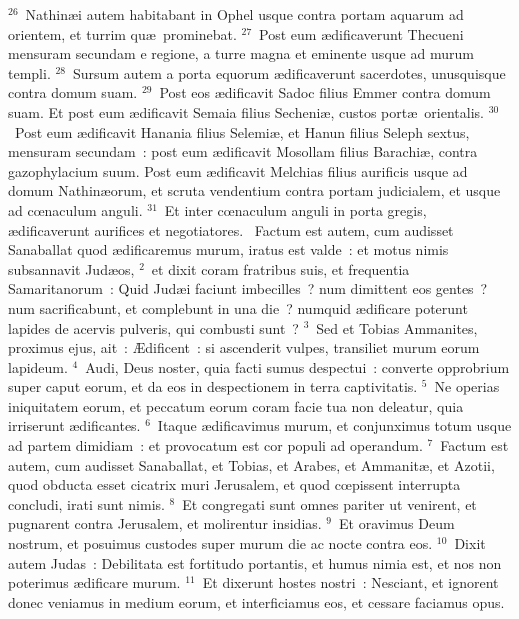 ${}^{26}$~Nathin\ae i autem habitabant in Ophel usque contra portam aquarum ad orientem, et turrim qu\ae\ prominebat.
${}^{27}$~Post eum \ae dificaverunt Thecueni mensuram secundam e regione, a turre magna et eminente usque ad murum templi.
${}^{28}$~Sursum autem a porta equorum \ae dificaverunt sacerdotes, unusquisque contra domum suam.
${}^{29}$~Post eos \ae dificavit Sadoc filius Emmer contra domum suam. Et post eum \ae dificavit Semaia filius Secheni\ae , custos port\ae\ orientalis.
${}^{30}$~Post eum \ae dificavit Hanania filius Selemi\ae , et Hanun filius Seleph sextus, mensuram secundam~: post eum \ae dificavit Mosollam filius Barachi\ae , contra gazophylacium suum. Post eum \ae dificavit Melchias filius aurificis usque ad domum Nathin\ae orum, et scruta vendentium contra portam judicialem, et usque ad cœnaculum anguli.
${}^{31}$~Et inter cœnaculum anguli in porta gregis, \ae dificaverunt aurifices et negotiatores.
~\lettrine[lines=10,image=true,loversize=0.05,lraise=-0.03]{F}{}actum est autem, cum audisset Sanaballat quod \ae dificaremus murum, iratus est valde~: et motus nimis subsannavit Jud\ae os,
${}^{2}$~et dixit coram fratribus suis, et frequentia Samaritanorum~: Quid Jud\ae i faciunt imbecilles~? num dimittent eos gentes~? num sacrificabunt, et complebunt in una die~? numquid \ae dificare poterunt lapides de acervis pulveris, qui combusti sunt~?
${}^{3}$~Sed et Tobias Ammanites, proximus ejus, ait~: \AE dificent~: si ascenderit vulpes, transiliet murum eorum lapideum.
${}^{4}$~Audi, Deus noster, quia facti sumus despectui~: converte opprobrium super caput eorum, et da eos in despectionem in terra captivitatis.
${}^{5}$~Ne operias iniquitatem eorum, et peccatum eorum coram facie tua non deleatur, quia irriserunt \ae dificantes.
${}^{6}$~Itaque \ae dificavimus murum, et conjunximus totum usque ad partem dimidiam~: et provocatum est cor populi ad operandum.
${}^{7}$~Factum est autem, cum audisset Sanaballat, et Tobias, et Arabes, et Ammanit\ae , et Azotii, quod obducta esset cicatrix muri Jerusalem, et quod cœpissent interrupta concludi, irati sunt nimis.
${}^{8}$~Et congregati sunt omnes pariter ut venirent, et pugnarent contra Jerusalem, et molirentur insidias.
${}^{9}$~Et oravimus Deum nostrum, et posuimus custodes super murum die ac nocte contra eos.
${}^{10}$~Dixit autem Judas~: Debilitata est fortitudo portantis, et humus nimia est, et nos non poterimus \ae dificare murum.
${}^{11}$~Et dixerunt hostes nostri~: Nesciant, et ignorent donec veniamus in medium eorum, et interficiamus eos, et cessare faciamus opus.
